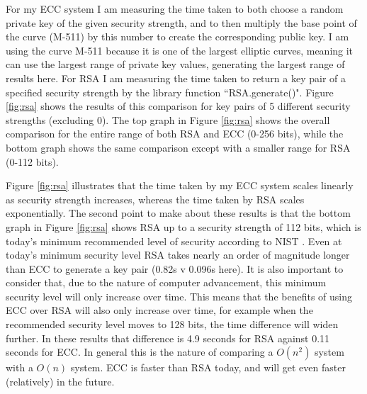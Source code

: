 \documentclass[12pt,a4paper]{article}
\begin{document}
For my ECC system I am measuring the time taken to both choose a random private key of the given security strength, 
and to then multiply the base point of the curve (M-511) by this number to create the corresponding public key. 
I am using the curve M-511 because it is one of the largest elliptic curves, 
meaning it can use the largest range of private key values, generating the largest range of results here. 
For RSA I am measuring the time taken to return a key pair of a specified security strength by the library function ``RSA.generate()". 
Figure \ref{fig:rsa} shows the results of this comparison for key pairs of 5 different security strengths (excluding 0). 
The top graph in Figure \ref{fig:rsa} shows the overall comparison for the entire range of both RSA and ECC (0-256 bits), 
while the bottom graph shows the same comparison except with a smaller range for RSA (0-112 bits). 

Figure \ref{fig:rsa} illustrates that the time taken by my ECC system scales linearly as security strength increases, 
whereas the time taken by RSA scales exponentially. 
The second point to make about these results is that the bottom graph in Figure \ref{fig:rsa} shows RSA up to a security strength of 112 bits, 
which is today's minimum recommended level of security according to NIST \cite[p54-55]{barker2020recommendation}. 
Even at today's minimum security level RSA takes nearly an order of magnitude longer than ECC to generate a key pair (0.82s v 0.096s here). 
It is also important to consider that, due to the nature of computer advancement, this minimum security level will only increase over time. 
This means that the benefits of using ECC over RSA will also only increase over time, 
for example when the recommended security level moves to 128 bits, the time difference will widen further. 
In these results that difference is 4.9 seconds for RSA against 0.11 seconds for ECC. 
In general this is the nature of comparing a $O(n^2)$ system with a $O(n)$ system. 
ECC is faster than RSA today, and will get even faster (relatively) in the future. 



\end{document}
